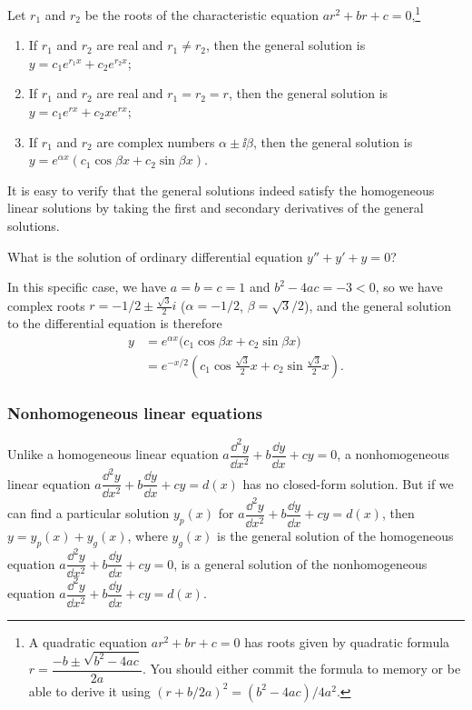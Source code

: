 Let $r_1$ and $r_2$ be the roots of the characteristic equation
$ar^2+br+c=0$,\footnote[9]{A quadratic equation $ar^2+br+c=0$ has roots given by quadratic formula
$r=\dfrac{-b\pm\sqrt{b^2-4ac}}{2a}$. You should either commit the formula to memory
or be able to derive it using $(r+b/2a)^2=(b^2-4ac)/4a^2$.}

\begin{enumerate}
\item If $r_1$ and $r_2$ are real and $r_1\ne r_2$, then the general solution is
      $y=c_1e^{r_1x}+c_2e^{r_2x}$;
\item If $r_1$ and $r_2$ are real and $r_1=r_2=r$, then the general solution is
      $y=c_1e^{rx}+c_2xe^{rx}$;
\item If $r_1$ and $r_2$ are complex numbers $\alpha\pm \ii\beta$, then the general
      solution is $y=e^{\alpha x}(c_1\cos\beta x+c_2\sin\beta x)$.
\end{enumerate}

It is easy to verify that the general solutions indeed satisfy the homogeneous linear
solutions by taking the first and secondary derivatives of the general solutions.

\begin{problem}{What is the solution of ordinary differential equation $y''+y'+y=0$?}
\end{problem}
\begin{solution}
In this specific case, we have $a=b=c=1$ and $b^2-4ac=-3<0$, so we have complex
roots $r=-1/2\pm\frac{\sqrt{3}}{2}i$ ($\alpha=-1/2$, $\beta=\sqrt{3}/2$), and the general
solution to the differential equation is therefore
\[
\begin{aligned}
y&=e^{\alpha x}\bigl(c_1\cos\beta x+c_2\sin\beta x\bigr)\\
 &=e^{-x/2}\left(c_1\cos\frac{\sqrt{3}}{2}x+c_2\sin\frac{\sqrt{3}}{2}x\right).
\end{aligned}
\]
\end{solution}

\subsubsection*{Nonhomogeneous linear equations}

Unlike a homogeneous linear equation
$a\dfrac{\dd^2y}{\dd x^2}+b\dfrac{\dd y}{\dd x}+cy=0$, a nonhomogeneous linear equation
$a\dfrac{\dd^2y}{\dd x^2}+b\dfrac{\dd y}{\dd x}+cy=d(x)$ has no closed-form solution. But if we
can find a particular solution $y_p(x)$ for
$a\dfrac{\dd^2y}{\dd x^2}+b\dfrac{\dd y}{\dd x}+cy=d(x)$, then $y=y_p(x)+y_g(x)$, where
$y_g(x)$ is the general solution of the homogeneous equation
$a\dfrac{\dd^2y}{\dd x^2}+b\dfrac{\dd y}{\dd x}+cy=0$, is a general solution of the nonhomogeneous
equation $a\dfrac{\dd^2y}{\dd x^2}+b\dfrac{\dd y}{\dd x}+cy=d(x)$.

